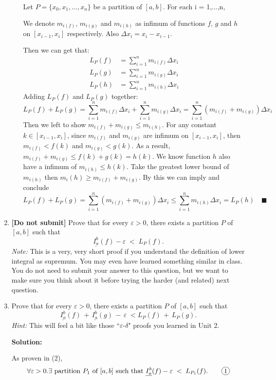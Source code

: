 \documentclass[12pt]{exam}
\newcommand*\circled[1]{\tikz[baseline=(char.base)]{
    \node[shape=circle, draw, inner sep=1pt, 
        minimum height=12pt] (char) {#1};}}
\newcommand{\e}{\varepsilon}
\begin{document}
\begin{enumerate}
\begin{enumerate}
	Let $P=\{x_0,x_1,...,x_n\}$ be a partition of $[a,b]$.
	For each i = 1,...,n,
	
	We denote $m_{i(f)}$, $m_{i(g)}$ and $m_{i(h)}$ as infimum of functions $f$, $g$ and $h$ on $[x_{i-1}, x_i]$ respectively. Also $\Delta x_i=x_i-x_{i-1}$.
	
	Then we can get that:
	\begin{align*}
	    L_{P}(f)&=\sum_{i=1}^n m_{i(f)}\Delta x_i\\
	    L_{P}(g)&=\sum_{i=1}^n m_{i(g)}\Delta x_i\\
	    L_{P}(h)&=\sum_{i=1}^n m_{i(h)}\Delta x_i
	\end{align*}
	Adding $L_{P}(f)$ and $L_{P}(g)$ together:
	$$
	    L_{P}(f)+L_{P}(g)=\sum_{i=1}^n m_{i(f)}\Delta x_i+\sum_{i=1}^n m_{i(g)}\Delta x_i=\sum_{i=1}^n (m_{i(f)}+m_{i(g)})\Delta x_i
	$$
	Then we left to show $m_{i(f)}+m_{i(g)}\leq m_{i(h)}$. For any constant $k\in[x_{i-1},x_i]$, since $m_{i(f)}$ and $m_{i(g)}$ are infimum on $[x_{i-1},x_i]$, then $m_{i(f)}<f(k)$ and $m_{i(g)}<g(k)$. As a result, $m_{i(f)}+m_{i(g)}\leq f(k)+g(k)=h(k)$. We know function $h$ also have a infimum of $m_{i(h)}\leq h(k)$. Take the greatest lower bound of $m_{i(h)}$ then $m_i{(h)}\geq m_{i(f)}+m_{i(g)}$. By this we can imply and conclude
	$$
	 L_{P}(f)+L_{P}(g)=\sum_{i=1}^n (m_{i(f)}+m_{i(g)})\Delta x_i\leq\sum_{i=1}^n m_{i(h)}\Delta x_i= L_{P}(h)\quad\blacksquare
	$$
	\end{enumerate}
	
\newpage

\item   {\bf [Do not submit]}  Prove that for every $\e>0$, there exists a partition $P$ of $[a,b]$ such that 
	$$
		\underline{I_a^b}(f) - \e \; < \;  L_P(f). 
	$$
	\emph{Note:}  This is a very, very short proof if you understand the definition of lower integral as supremum.  You may even have learned something similar in class.  You do not need to submit your answer to this question, but we want to make sure you think about it before trying the harder (and related) next question.

\item  Prove that for every $\e>0$, there exists a partition $P$ of $[a,b]$ such that
	$$
		\underline{I_a^b}(f) \, + \, \underline{I_a^b}(g) \, - \, \e \; < L_P(f) \, + \, L_P(g).
	$$
	\emph{Hint:}  This will feel a bit like those ``$\e$-$\delta$" proofs you learned in Unit 2.
	
	\textbf{Solution:}
	
	As proven in (2), $$\forall \e>0.\exists \mbox{ partition } P_1 \mbox{ of } [a,b]\mbox{ such that } \underline{I_a^b}(f) - \e \; < \;  L_{P_1}(f).\qquad\circled{1}$$
	

\end{enumerate}
\end{document}
